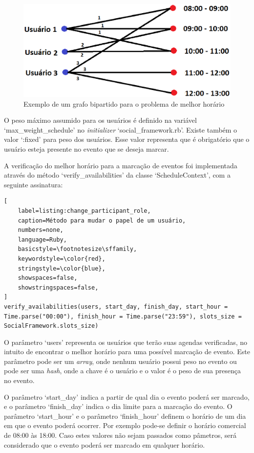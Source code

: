 \begin{figure}[h]
    \centering
    \includegraphics[scale=0.6]{figuras/social_framework/melhor_horario.eps}
    \caption{Exemplo de um grafo bipartido para o problema de melhor horário}
    \label{melhor_horario}
\end{figure}

O peso máximo assumido para os usuários é definido na variável `max\_weight\_schedule' no \textit{initializer} `social\_framework.rb'. Existe também o valor `:fixed' para peso dos usuários. Esse valor representa que é obrigatório que o usuário esteja presente no evento que se deseja marcar.

A verificação do melhor horário para a marcação de eventos foi implementada através do método `verify\_availabilities' da classe `ScheduleContext', com a seguinte assinatura:

\begin{lstlisting}[
    label=listing:change_participant_role,
    caption=Método para mudar o papel de um usuário,
    numbers=none,
    language=Ruby,
    basicstyle=\footnotesize\sffamily,
    keywordstyle=\color{red},
    stringstyle=\color{blue},
    showspaces=false,
    showstringspaces=false,
]
verify_availabilities(users, start_day, finish_day, start_hour = Time.parse("00:00"), finish_hour = Time.parse("23:59"), slots_size = SocialFramework.slots_size)
\end{lstlisting}

O parâmetro `users' representa os usuários que terão suas agendas verificadas, no intuito de encontrar o melhor horário para uma possível marcação de evento. Este parâmetro pode ser um \textit{array}, onde nenhum usuário possui peso no evento ou pode ser uma \textit{hash}, onde a chave é o usuário e o valor é o peso de sua presença no evento.

O parâmetro `start\_day' indica a partir de qual dia o evento poderá ser marcado, e o parâmetro `finish\_day' indica o dia limite para a marcação do evento. O parâmetro `start\_hour' e o parâmetro `finish\_hour' definem o horário de um dia em que o evento poderá ocorrer. Por exemplo pode-se definir o horário comercial de 08:00 às 18:00. Caso estes valores não sejam passados como pâmetros, será considerado que o evento poderá ser marcado em qualquer horário.

